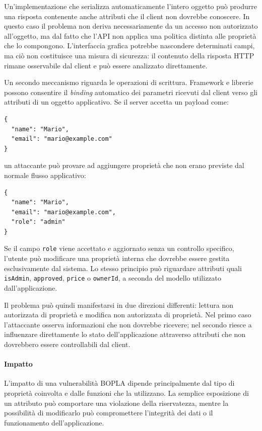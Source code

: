 Un'implementazione che serializza automaticamente l'intero oggetto può produrre una risposta contenente anche attributi che il client non dovrebbe conoscere. In questo caso il problema non deriva necessariamente da un accesso non autorizzato all'oggetto, ma dal fatto che l'API non applica una politica distinta alle proprietà che lo compongono. L'interfaccia grafica potrebbe nascondere determinati campi, ma ciò non costituisce una misura di sicurezza: il contenuto della risposta HTTP rimane osservabile dal client e può essere analizzato direttamente.

Un secondo meccanismo riguarda le operazioni di scrittura. Framework e librerie possono consentire il \textit{binding} automatico dei parametri ricevuti dal client verso gli attributi di un oggetto applicativo. Se il server accetta un payload come:

\begin{verbatim}
{
  "name": "Mario",
  "email": "mario@example.com"
}
\end{verbatim}

un attaccante può provare ad aggiungere proprietà che non erano previste dal normale flusso applicativo:

\begin{verbatim}
{
  "name": "Mario",
  "email": "mario@example.com",
  "role": "admin"
}
\end{verbatim}

Se il campo \texttt{role} viene accettato e aggiornato senza un controllo specifico, l'utente può modificare una proprietà interna che dovrebbe essere gestita esclusivamente dal sistema. Lo stesso principio può riguardare attributi quali \texttt{isAdmin}, \texttt{approved}, \texttt{price} o \texttt{ownerId}, a seconda del modello utilizzato dall'applicazione.

Il problema può quindi manifestarsi in due direzioni differenti: lettura non autorizzata di proprietà e modifica non autorizzata di proprietà. Nel primo caso l'attaccante osserva informazioni che non dovrebbe ricevere; nel secondo riesce a influenzare direttamente lo stato dell'applicazione attraverso attributi che non dovrebbero essere controllabili dal client.

\paragraph{Impatto}

L'impatto di una vulnerabilità BOPLA dipende principalmente dal tipo di proprietà coinvolta e dalle funzioni che la utilizzano. La semplice esposizione di un attributo può comportare una violazione della riservatezza, mentre la possibilità di modificarlo può compromettere l'integrità dei dati o il funzionamento dell'applicazione.

